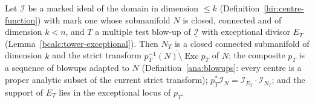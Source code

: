 \begin{theorem}
\label{mc:factorization-tower}
\leanok
Let \(\underline{\mathcal I}\) be a marked ideal of the domain in dimension \(\le k\) (Definition~\ref{hir:centre-function}) with mark one whose submanifold \(N\) is closed,
connected and of dimension \(k<n\), and \(T\) a multiple test blow-up of \(\underline{\mathcal I}\) with exceptional divisor \(E_T\) (Lemma~\ref{bcalc:tower-exceptional}). Then
\(N_T\) is a closed connected submanifold of dimension \(k\) and the strict transform \(\overline{p_T^{-1}(N)\setminus\operatorname{Exc}p_T}\) of \(N\); the composite \(p_T\) is
a sequence of blowups adapted to \(N\) (Definition~\ref{ana:blowups}: every centre is a proper analytic subset of the current strict transform); \(p_T^*\mathcal I_N=\mathcal
I_{E_T}\cdot\mathcal I_{N_T}\); and the support of \(E_T\) lies in the exceptional locus of \(p_T\).
\end{theorem}
